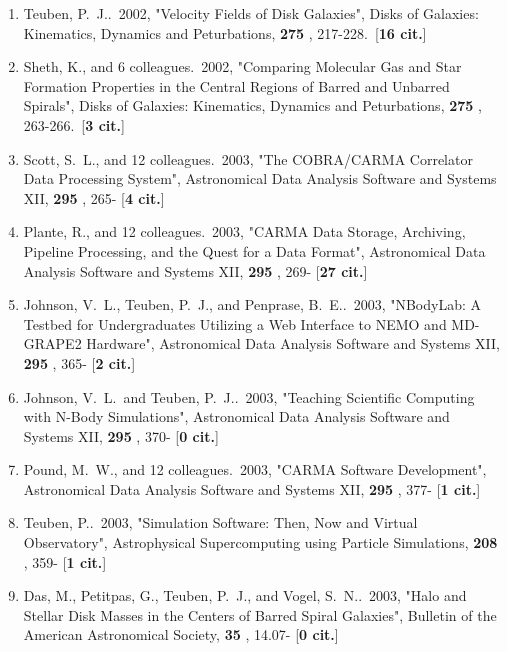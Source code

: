 \documentclass[11pt,letterpaper]{article}
\begin{document}
\begin{enumerate}[resume,label=\textbf{\arabic*}.]
\item  
Teuben, P.~J..\  2002,  "Velocity Fields of Disk Galaxies", Disks of 
Galaxies: Kinematics, Dynamics and Peturbations,  {\bf 275} , 217-228.\  
[{\bf 16 cit.}] 

\item  
Sheth, K., and 6 colleagues.\  2002,  "Comparing Molecular Gas and Star 
Formation Properties in the Central Regions of Barred and Unbarred 
Spirals", Disks of Galaxies: Kinematics, Dynamics and Peturbations,  {\bf 
275} , 263-266.\  [{\bf 3 cit.}] 

\item  
Scott, S.~L., and 12 colleagues.\  2003,  "The COBRA/CARMA Correlator Data 
Processing System", Astronomical Data Analysis Software and Systems XII,  
{\bf 295} , 265- [{\bf 4 cit.}] 

\item  
Plante, R., and 12 colleagues.\  2003,  "CARMA Data Storage, Archiving, 
Pipeline Processing, and the Quest for a Data Format", Astronomical Data 
Analysis Software and Systems XII,  {\bf 295} , 269- [{\bf 27 cit.}] 

\item  
Johnson, V.~L., Teuben, P.~J., and Penprase, B.~E..\  2003,  "NBodyLab: A 
Testbed for Undergraduates Utilizing a Web Interface to NEMO and MD-GRAPE2 
Hardware", Astronomical Data Analysis Software and Systems XII,  {\bf 295} 
, 365- [{\bf 2 cit.}] 

\item  
Johnson, V.~L.~and Teuben, P.~J..\  2003,  "Teaching Scientific Computing 
with N-Body Simulations", Astronomical Data Analysis Software and Systems 
XII,  {\bf 295} , 370- [{\bf 0 cit.}] 

\item  
Pound, M.~W., and 12 colleagues.\  2003,  "CARMA Software Development", 
Astronomical Data Analysis Software and Systems XII,  {\bf 295} , 377- 
[{\bf 1 cit.}] 

\item  
Teuben, P..\  2003,  "Simulation Software: Then, Now and Virtual 
Observatory", Astrophysical Supercomputing using Particle Simulations,  
{\bf 208} , 359- [{\bf 1 cit.}] 

\item  
Das, M., Petitpas, G., Teuben, P.~J., and Vogel, S.~N..\  2003,  "Halo and 
Stellar Disk Masses in the Centers of Barred Spiral Galaxies", Bulletin of 
the American Astronomical Society,  {\bf 35} , 14.07- [{\bf 0 cit.}] 


\end{enumerate}
\end{document}
